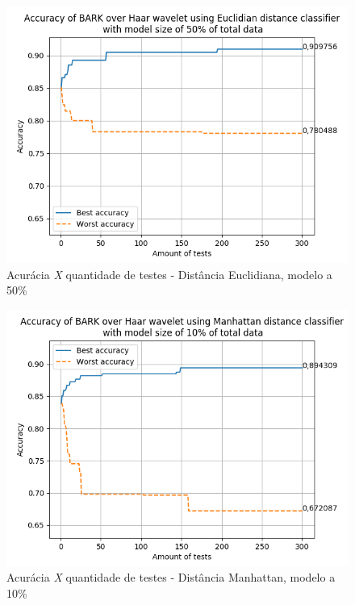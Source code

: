 \begin{myenv}{1.5}
		\newpage
		\begin{figure}[h]
			\centering
			\includegraphics{images/results/confusionMatrices/classifier_Euclidian_50}
			\caption{Acurácia \textit{X} quantidade de testes - Distância Euclidiana, modelo a 50\%}
			\label{fig:classifiereuclidian50}
		\end{figure}
		
	
		\newpage
		\begin{figure}[h]
			\centering
			\includegraphics{images/results/confusionMatrices/classifier_Manhattan_10.png}
			\caption{Acurácia \textit{X} quantidade de testes - Distância Manhattan, modelo a 10\%}
			\label{fig:classifiermanhattan10}
		\end{figure}
		
	

\end{myenv}
